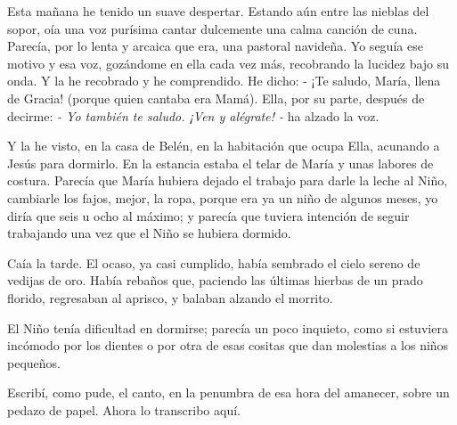 \documentclass[12pt]{book} %
\begin{document}
Esta mañana he tenido un suave despertar. Estando aún entre las nieblas del sopor, oía una voz purísima cantar dulcemente una calma canción de cuna. Parecía, por lo lenta y arcaica que era, una pastoral navideña. Yo seguía ese motivo y esa voz, gozándome en ella cada vez más, recobrando la lucidez bajo su onda. Y la he recobrado y he comprendido. He dicho: - ¡Te saludo, María, llena de Gracia! (porque quien cantaba era Mamá). Ella, por su parte, después de decirme: 
\emph{- Yo también te saludo. ¡Ven y alégrate! -} ha alzado la voz.

Y la he visto, en la casa de Belén, en la habitación que ocupa Ella, acunando a Jesús para dormirlo. En la estancia estaba el telar de María y unas labores de costura. Parecía que María hubiera dejado el trabajo para darle la leche al Niño, cambiarle los fajos, mejor, la ropa, porque era ya un niño de algunos meses, yo diría que seis u ocho al máximo; y parecía que tuviera intención de seguir trabajando una vez que el Niño se hubiera dormido. 

Caía la tarde. El ocaso, ya casi cumplido, había sembrado el cielo sereno de vedijas de oro. Había rebaños que, paciendo las últimas hierbas de un prado florido, regresaban al aprisco, y balaban alzando el morrito. 

El Niño tenía dificultad en dormirse; parecía un poco inquieto, como si estuviera incómodo por los dientes o por otra de esas cositas que dan molestias a los niños pequeños. 

Escribí, como pude, el canto, en la penumbra de esa hora del amanecer, sobre un pedazo de papel. Ahora lo transcribo aquí. 
\end{document}
